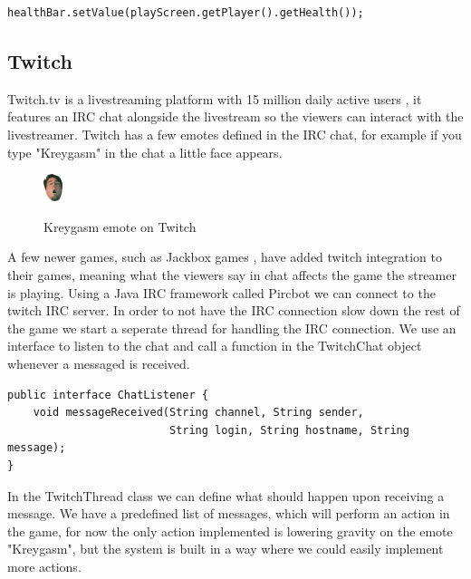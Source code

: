 \documentclass[12p]{article}
\begin{document}
\begin{verbatim}
healthBar.setValue(playScreen.getPlayer().getHealth());
\end{verbatim}


\newpage
\subsection{Twitch} \label{Twitch}

Twitch.tv is a livestreaming platform with 15 million daily active users \cite{twitchAbout}, it features an IRC chat alongside the livestream so the viewers can interact with the livestreamer. Twitch has a few emotes defined in the IRC chat, for example if you type "Kreygasm" in the chat a little face appears.

\begin{figure}[ht]
  \center
  \includegraphics[width=0.05\textwidth]{Documentation/Kreygasm.png}
  \label{Kreygasm_emote}
  \caption{Kreygasm emote on Twitch \cite{TwitchEmotes}}
\end{figure}

A few newer games, such as Jackbox games \cite{JackboxGames}, have added twitch integration to their games, meaning what the viewers say in chat affects the game the streamer is playing. Using a Java IRC framework called Pircbot\cite{pircbot} we can connect to the twitch IRC server. In order to not have the IRC connection slow down the rest of the game we start a seperate thread for handling the IRC connection. We use an interface to listen to the chat and call a function in the TwitchChat object whenever a messaged is received.

\begin{verbatim}
public interface ChatListener {
    void messageReceived(String channel, String sender,
                         String login, String hostname, String message);
}
\end{verbatim}

In the TwitchThread class we can define what should happen upon receiving a message. We have a predefined list of messages, which will perform an action in the game, for now the only action implemented is lowering gravity on the emote "Kreygasm", but the system is built in a way where we could easily implement more actions.
\end{document}
